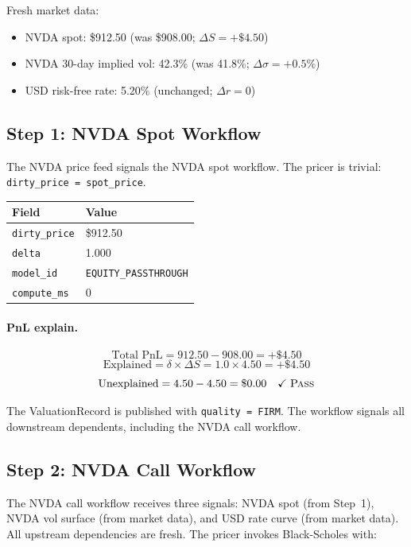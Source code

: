 \documentclass[11pt,a4paper]{article}
\begin{document}
Fresh market data:
\begin{itemize}[nosep]
\item NVDA spot: \$912.50 (was \$908.00; $\Delta S = +\$4.50$)
\item NVDA 30-day implied vol: 42.3\% (was 41.8\%; $\Delta\sigma = +0.5\%$)
\item USD risk-free rate: 5.20\% (unchanged; $\Delta r = 0$)
\end{itemize}

\subsection{Step 1: NVDA Spot Workflow}

The NVDA price feed signals the NVDA spot workflow.  The pricer is trivial: \texttt{dirty\_price = spot\_price}.

\begin{center}
\small
\begin{tabular}{l l}
\toprule
\textbf{Field} & \textbf{Value} \\
\midrule
\texttt{dirty\_price} & \$912.50 \\
\texttt{delta} & 1.000 \\
\texttt{model\_id} & \texttt{EQUITY\_PASSTHROUGH} \\
\texttt{compute\_ms} & 0 \\
\bottomrule
\end{tabular}
\end{center}

\paragraph{PnL explain.}
\[
\text{Total PnL} = 912.50 - 908.00 = +\$4.50
\]
\[
\text{Explained} = \delta \times \Delta S = 1.0 \times 4.50 = +\$4.50
\]
\[
\text{Unexplained} = 4.50 - 4.50 = \$0.00 \quad\checkmark\;\textsc{Pass}
\]

The ValuationRecord is published with \texttt{quality = FIRM}.  The workflow signals all downstream dependents, including the NVDA call workflow.

\subsection{Step 2: NVDA Call Workflow}

The NVDA call workflow receives three signals: NVDA spot (from Step~1), NVDA vol surface (from market data), and USD rate curve (from market data).  All upstream dependencies are fresh.  The pricer invokes Black-Scholes with:
\end{document}
